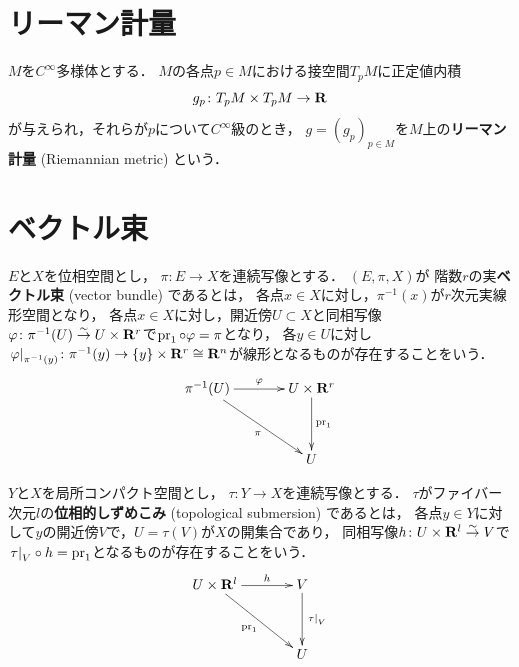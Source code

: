 \section{リーマン計量}

\begin{leftbar}
\begin{DFN}
  \(M\)を\(C^{\infty}\)多様体とする．
  \(M\)の各点\(p\in M\)における接空間\(T_{p}M\)に正定値内積
  \[
    g_{p}\colon T_{p}M\times T_{p}M\to \rr
  \]
  が与えられ，それらが\(p\)について\(C^{\infty}\)級のとき，
  \(g=(g_p)_{p\in M}\)を\(M\)上の\textbf{リーマン計量} (Riemannian metric) という．
\end{DFN}
\end{leftbar}







\section{ベクトル束}
\begin{leftbar}
\begin{DFN}
  \(E\)と\(X\)を位相空間とし，
  \(\pi\colon E\to X\)を連続写像とする．
  \((E,\pi,X)\)が
  階数\(r\)の実\textbf{ベクトル束} (vector bundle) であるとは，
  各点\(x\in X\)に対し，\(\pi^{-1}(x)\)が\(r\)次元実線形空間となり，
  各点\(x\in X\)に対し，開近傍\(U\subset X\)と同相写像\(
    \varphi\colon \pi^{-1}(U)\simar U\times \rr^r
  \)で\(\pr_1\circ\varphi=\pi\)となり，
  各\(y\in U\)に対し\(
    \mres[\varphi]{\pi^{-1}(y)}\colon 
    \pi^{-1}(y)\to \{y\}\times\rr^r\cong \rr^n
  \)が線形となるものが存在することをいう．
  \[\vcenter{\xymatrix@C=36pt@R=36pt{
    \pi^{-1}(U)
    \ar[dr]_-{\pi}
    \ar[r]^-{\varphi}
    &
    U\times \rr^r
    \ar[d]^-{\pr_1}
    \\
    &
    U
  }}\]
\end{DFN}  
\end{leftbar}

\begin{leftbar}
\begin{DFN}[{\cite[Def.3.3.1]{KS90}}]
  \(Y\)と\(X\)を局所コンパクト空間とし，
  \(\tau\colon Y\to X\)を連続写像とする．
  \(\tau\)がファイバー次元\(l\)の\textbf{位相的しずめこみ} (topological submersion) であるとは，
  各点\(y\in Y\)に対して\(y\)の開近傍\(V\)で，\(U=\tau(V)\)が\(X\)の開集合であり，
  同相写像\(h\colon U\times \rr^l\simar V\)で\(\mres[\tau]{V}\circ h=\pr_1\)となるものが存在することをいう．
  \[\vcenter{\xymatrix@C=36pt@R=36pt{
    U\times \rr^l
    \ar[dr]_-{\pr_1}
    \ar[r]^-{h}
    &
    V
    \ar[d]^-{\mres[\tau]{V}}
    \\
    &
    U
  }}\]
\end{DFN} 
\end{leftbar}
  
